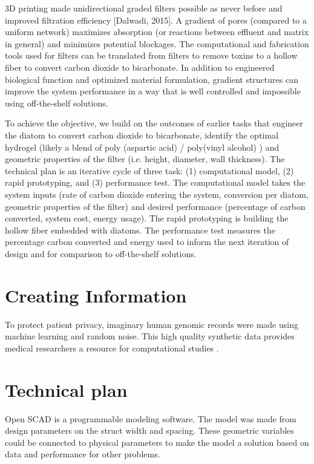 \documentclass[a4paper,11pt]{article}
\begin{document}
3D printing made unidirectional graded filters possible as never before and improved filtration efficiency [Dalwadi, 2015]. A gradient of pores (compared to a uniform network) maximizes absorption (or reactions between effluent and matrix in general) and minimizes potential blockages. The computational and fabrication tools used for filters can be translated from filters to remove toxins to a hollow fiber to convert carbon dioxide to bicarbonate. In addition to engineered biological function and optimized material formulation, gradient structures can improve the system performance in a way that is well controlled and impossible using off-the-shelf solutions.

To achieve the objective, we build on the outcomes of earlier tasks that engineer the diatom to convert carbon dioxide to bicarbonate, identify the optimal hydrogel (likely a blend of poly (aspartic acid) / poly(vinyl alcohol) ) and geometric properties of the filter (i.e. height, diameter, wall thickness).
The technical plan is an iterative cycle of three task: (1) computational model,  (2) rapid prototyping, and (3) performance test. The computational model takes the system inputs (rate of carbon dioxide entering the system, conversion per diatom, geometric properties of the filter) and desired performance (percentage of carbon converted, system cost, energy usage). The rapid prototyping is building the hollow fiber embedded with diatoms. The performance test measures the percentage carbon converted and energy used to inform the next iteration of design and for comparison to off-the-shelf solutions.

\section{Creating Information}


To protect patient privacy, imaginary human genomic records were made using machine learning and random noise. This high quality synthetic data provides medical researchers a resource for computational studies \cite{yelmen2021creating}.

\section{Technical plan}

Open SCAD is a programmable modeling software. The model was made from design parameters on the struct width and spacing. These geometric variables could be connected to physical parameters to make the model a solution based on data and performance for other problems.
\end{document}

